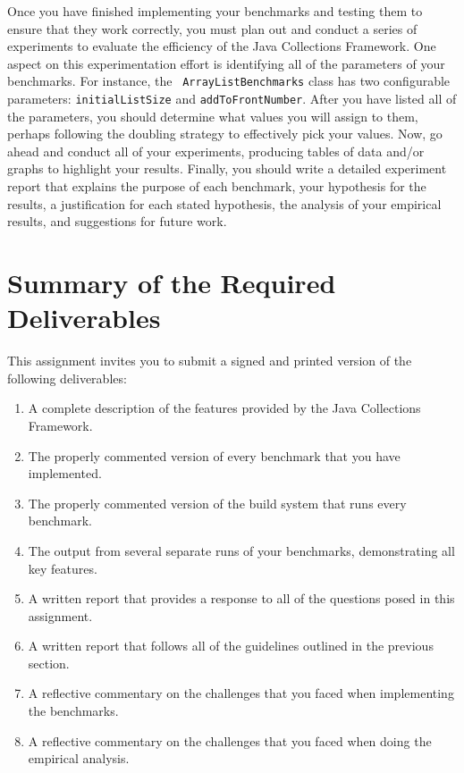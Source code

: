 Once you have finished implementing your benchmarks and testing them to ensure that they work correctly, you must plan
out and conduct a series of experiments to evaluate the efficiency of the Java Collections Framework. One aspect on this
experimentation effort is identifying all of the parameters of your benchmarks. For instance, the {\tt
ArrayListBenchmarks} class has two configurable parameters: {\tt initialListSize} and {\tt addToFrontNumber}. After you
have listed all of the parameters, you should determine what values you will assign to them, perhaps following the
doubling strategy to effectively pick your values. Now, go ahead and conduct all of your experiments, producing tables
of data and/or graphs to highlight your results. Finally, you should write a detailed experiment report that explains the
purpose of each benchmark, your hypothesis for the results, a justification for each stated hypothesis, the analysis of
your empirical results, and suggestions for future work.

\section*{Summary of the Required Deliverables}

  This assignment invites you to submit a signed and printed version of the following deliverables:

  \begin{enumerate}
  \itemsep0pt

  \item A complete description of the features provided by the Java Collections Framework.

  \item The properly commented version of every benchmark that you have implemented.

  \item The properly commented version of the build system that runs every benchmark.

  \item The output from several separate runs of your benchmarks, demonstrating all key features.

  \item A written report that provides a response to all of the questions posed in this assignment.

  \item A written report that follows all of the guidelines outlined in the previous section.

  \item A reflective commentary on the challenges that you faced when implementing the benchmarks.

  \item A reflective commentary on the challenges that you faced when doing the empirical analysis.

  \end{enumerate}

